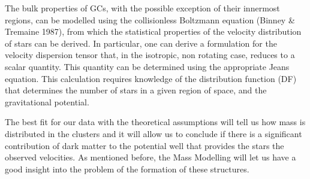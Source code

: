 The bulk properties of GCs, with the possible exception of their innermost regions, can be modelled using the collisionless Boltzmann equation (Binney \& Tremaine 1987), from which the statistical properties of the velocity distribution of stars can be derived. In particular, one can derive a formulation for the velocity dispersion tensor that, in the isotropic, non rotating case, reduces to a scalar quantity. This quantity can be determined using the appropriate Jeans equation. This calculation requires knowledge of the distribution function (DF) that determines the number of stars in a given region of space, and the gravitational potential.

The best fit for our data with the theoretical assumptions will tell us how mass is distributed in the clusters and it will allow us to conclude if there is a significant contribution of dark matter to the potential well that provides the stars the observed velocities. As mentioned before, the Mass Modelling will let us have a good insight into the problem of the formation of these structures.


